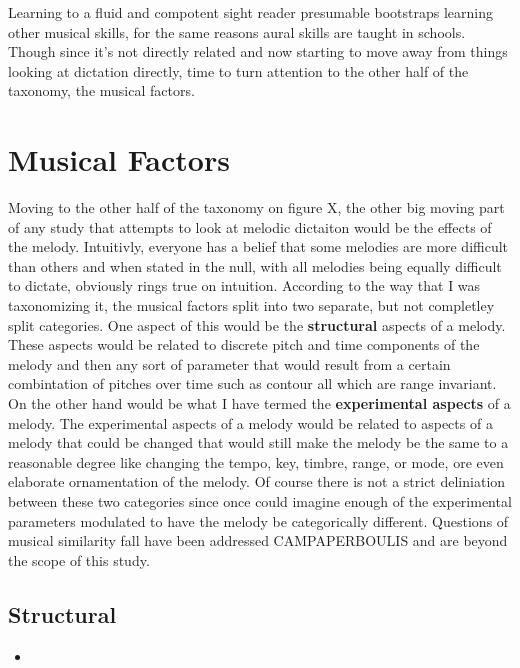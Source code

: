 \documentclass[]{book}
\providecommand{\tightlist}{%
  \setlength{\itemsep}{0pt}\setlength{\parskip}{0pt}}
\theoremstyle{definition}
\theoremstyle{definition}
\theoremstyle{definition}
\theoremstyle{remark}
\begin{document}
Learning to a fluid and compotent sight reader presumable bootstraps
learning other musical skills, for the same reasons aural skills are
taught in schools. Though since it's not directly related and now
starting to move away from things looking at dictation directly, time to
turn attention to the other half of the taxonomy, the musical factors.

\hypertarget{musical-factors}{%
\section{Musical Factors}\label{musical-factors}}

Moving to the other half of the taxonomy on figure X, the other big
moving part of any study that attempts to look at melodic dictaiton
would be the effects of the melody. Intuitivly, everyone has a belief
that some melodies are more difficult than others and when stated in the
null, with all melodies being equally difficult to dictate, obviously
rings true on intuition. According to the way that I was taxonomizing
it, the musical factors split into two separate, but not completley
split categories. One aspect of this would be the \textbf{structural}
aspects of a melody. These aspects would be related to discrete pitch
and time components of the melody and then any sort of parameter that
would result from a certain combintation of pitches over time such as
contour all which are range invariant. On the other hand would be what I
have termed the \textbf{experimental aspects} of a melody. The
experimental aspects of a melody would be related to aspects of a melody
that could be changed that would still make the melody be the same to a
reasonable degree like changing the tempo, key, timbre, range, or mode,
ore even elaborate ornamentation of the melody. Of course there is not a
strict deliniation between these two categories since once could imagine
enough of the experimental parameters modulated to have the melody be
categorically different. Questions of musical similarity fall have been
addressed CAMPAPERBOULIS and are beyond the scope of this study.

\hypertarget{structural}{%
\subsection{Structural}\label{structural}}

\begin{itemize}
\tightlist
\item
  \citep{schenkerFreieSatz1935}
\end{itemize}
\end{document}
